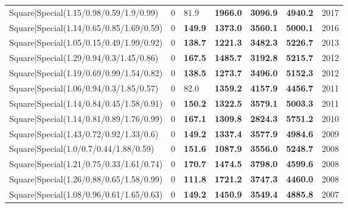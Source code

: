 \begin{tabular}{lrllllr}
 Square|Special(1.15/0.98/0.59/1.9/0.99)                       &             0   & 81.9           & \textbf{1966.0} & \textbf{3096.9} & \textbf{4940.2} &         2017 \\
 Square|Special(1.14/0.65/0.85/1.69/0.59)                      &             0   & \textbf{149.9} & \textbf{1373.0} & \textbf{3560.1} & \textbf{5000.1} &         2016 \\
 Square|Special(1.05/0.15/0.49/1.99/0.92)                      &             0   & \textbf{138.7} & \textbf{1221.3} & \textbf{3482.3} & \textbf{5226.7} &         2013 \\
 Square|Special(1.29/0.94/0.3/1.45/0.86)                       &             0   & \textbf{167.5} & \textbf{1485.7} & \textbf{3192.8} & \textbf{5215.7} &         2012 \\
 Square|Special(1.19/0.69/0.99/1.54/0.82)                      &             0   & \textbf{138.5} & \textbf{1273.7} & \textbf{3496.0} & \textbf{5152.3} &         2012 \\
 Square|Special(1.06/0.94/0.3/1.85/0.57)                       &             0   & 82.0           & \textbf{1359.2} & \textbf{4157.9} & \textbf{4456.7} &         2011 \\
 Square|Special(1.14/0.84/0.45/1.58/0.91)                      &             0   & \textbf{150.2} & \textbf{1322.5} & \textbf{3579.1} & \textbf{5003.3} &         2011 \\
 Square|Special(1.14/0.81/0.89/1.76/0.99)                      &             0   & \textbf{167.1} & \textbf{1309.8} & \textbf{2824.3} & \textbf{5751.2} &         2010 \\
 Square|Special(1.43/0.72/0.92/1.33/0.6)                       &             0   & \textbf{149.2} & \textbf{1337.4} & \textbf{3577.9} & \textbf{4984.6} &         2009 \\
 Square|Special(1.0/0.7/0.44/1.88/0.59)                        &             0   & \textbf{151.6} & \textbf{1087.9} & \textbf{3556.0} & \textbf{5248.7} &         2008 \\
 Square|Special(1.21/0.75/0.33/1.61/0.74)                      &             0   & \textbf{170.7} & \textbf{1474.5} & \textbf{3798.0} & \textbf{4599.6} &         2008 \\
 Square|Special(1.26/0.88/0.65/1.58/0.99)                      &             0   & \textbf{111.8} & \textbf{1721.2} & \textbf{3747.3} & \textbf{4460.0} &         2008 \\
 Square|Special(1.08/0.96/0.61/1.65/0.63)                      &             0   & \textbf{149.2} & \textbf{1450.9} & \textbf{3549.4} & \textbf{4885.8} &         2007 \\

\end{tabular}

